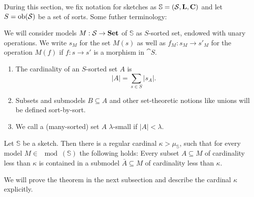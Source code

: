 During this section, we fix notation for sketches as $\mathbb S = (\mathcal{S}, \textbf{L}, \textbf{C})$ and let $S=\textrm{ob}(\mathcal{S})$ be a set of sorts. Some futher terminology:

\begin{Definition}
We will consider models $M : \mathcal{S} \to \mathbf{Set}$ of $\mathbb S$ as $S$-sorted set, endowed with unary operations. We write $s_M$ for the set $M(s)$ as well as $f_M : s_M \to s'_M$ for the operation $M(f)$ if $f : s \to s'$ is a morphism in $\cat S$.
\begin{enumerate}
\item The cardinality of an $S$-sorted set $A$ is \[ |A| = \sum_{s \in S} |s_A|. \]
\item Subsets and submodels $B \subseteq A$ and other set-theoretic notions like unions will be defined sort-by-sort.
\item We call a (many-sorted) set $A$ $\lambda$-small if $|A|<\lambda$.
\end{enumerate}
\end{Definition}

\begin{Theorem}\label{thm:ls}
Let $\mathbb S$ be a sketch. Then there is a regular cardinal $\kappa > \mu_{\mathbb S}$, such that for every model $M \in \mod(\mathbb S)$ the following holds: Every subset $A \subseteq M$ of cardinality less than $\kappa$ is contained in a submodel $\bar A \subseteq M$ of cardinality less than $\kappa$.
\end{Theorem}
We will prove the theorem in the next subsection and describe the cardinal $\kappa$ explicitly.

